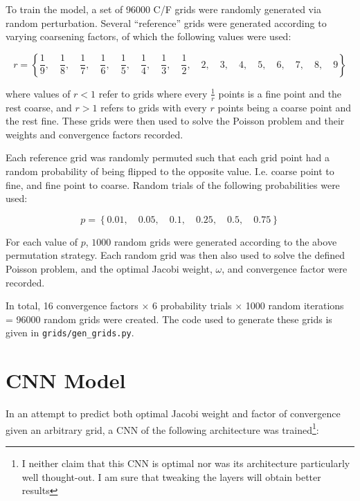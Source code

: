 To train the model, a set of 96000 C/F grids were randomly generated via random perturbation.  Several ``reference'' grids were generated according to varying coarsening factors, of which the following values were used:

$$r = \left\{
\frac{1}{9},\quad
\frac{1}{8},\quad
\frac{1}{7},\quad
\frac{1}{6},\quad
\frac{1}{5},\quad
\frac{1}{4},\quad
\frac{1}{3},\quad
\frac{1}{2},\quad
2,\quad
3,\quad
4,\quad
5,\quad
6,\quad
7,\quad
8,\quad
9
\right\}$$

where values of $r<1$ refer to grids where every $\frac{1}{r}$ points is a fine point and the rest coarse, and $r>1$ refers to grids with every $r$ points being a coarse point and the rest fine.  These grids were then used to solve the Poisson problem and their weights and convergence factors recorded.

Each reference grid was randomly permuted such that each grid point had a random probability of being flipped to the opposite value.  I.e. coarse point to fine, and fine point to coarse.  Random trials of the following probabilities were used:

$$ p = \left\{0.01, \quad 0.05, \quad 0.1, \quad 0.25, \quad 0.5, \quad 0.75\right\} $$

For each value of $p$, $1000$ random grids were generated according to the above permutation strategy.  Each random grid was then also used to solve the defined Poisson problem, and the optimal Jacobi weight, $\omega$, and convergence factor were recorded.

In total, 16 convergence factors $\times$ 6 probability trials $\times$ 1000 random iterations = 96000 random grids were created.  The code used to generate these grids is given in \texttt{grids/gen\_grids.py}.

\section{CNN Model}

In an attempt to predict both optimal Jacobi weight and factor of convergence given an arbitrary grid, a CNN of the following architecture was trained\footnote{I neither claim that this CNN is optimal nor was its architecture particularly well thought-out.  I am sure that tweaking the layers will obtain better results}:

